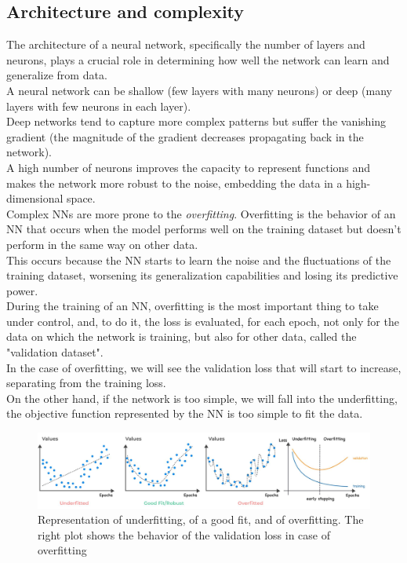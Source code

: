 \subsection{Architecture and complexity}
The architecture of a neural network, specifically the number of layers and neurons, plays a crucial role in determining how well the network can learn and generalize from data.\\
A neural network can be shallow (few layers with many neurons) or deep (many layers with few neurons in each layer). \\
Deep networks tend to capture more complex patterns but suffer the vanishing gradient (the  magnitude of the gradient decreases propagating back in the network).\\
A high number of neurons improves the capacity to represent functions and makes the network more robust to the noise, embedding the data in a high-dimensional space.\\
Complex NNs are more prone to the \textit{overfitting}.
Overfitting is the behavior of an NN that occurs when the model performs well on the training dataset but doesn't perform in the same way on other data.\\
This occurs because the NN starts to learn the noise and the fluctuations of the training dataset, worsening its generalization capabilities and losing its predictive power.\\
During the training of an NN, overfitting is the most important thing to take under control, and, to do it, the loss is evaluated, for each epoch, not only for the data on which the network is training, but also for other data, called the "validation dataset".
\\
In the case of overfitting, we will see the validation loss that will start to increase, separating from the training loss.\\
On the other hand, if the network is too simple, we will fall into the underfitting, \ie the objective function represented by the NN is too simple to fit the data.
\vspace{-0.15cm}
\begin{figure}[H]
    \centering
    \includegraphics[width=1\linewidth]{fig/chap05-stats/overfit.jpg}
    \caption{Representation of underfitting, of a good fit, and of overfitting. The right plot shows the behavior of the validation loss in case of overfitting}
    \label{fig:overfitting}
\end{figure}

